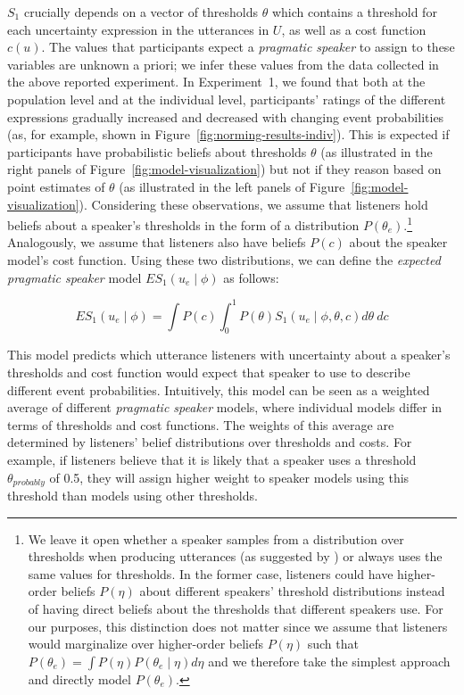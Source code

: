 \documentclass[man, floatsintext]{apa6}
\begin{document}
$S_1$ crucially depends on a vector of thresholds $\theta$ which contains a threshold for each uncertainty expression in the utterances in $U$, 
as well as a cost function $c(u)$. The values that participants expect a \textit{pragmatic speaker} to assign 
to these variables are unknown a priori; we infer these values from the data collected in the above reported experiment. 
In Experiment~1, we found that both at the population level and at the individual level, 
participants' ratings of the different expressions gradually increased and decreased with changing event probabilities 
(as, for example, shown in Figure~\ref{fig:norming-results-indiv}). This is expected if participants
have probabilistic beliefs about thresholds $\theta$ (as illustrated in the right panels of Figure~\ref{fig:model-visualization}) but not if they reason based on point estimates of $\theta$ (as illustrated in the left panels of Figure~\ref{fig:model-visualization}).
Considering these observations,  we assume that listeners hold beliefs about a speaker's thresholds in the form of a distribution $P\left(\theta_e\right)$.\footnote{We leave it open 
whether a {speaker} samples from a distribution over thresholds when producing utterances (as suggested by \textcite{Qing2015}) 
or always uses the same values for thresholds. In the former case, listeners could have higher-order beliefs  $P(\eta)$ 
about different {speakers}' threshold distributions instead of having direct beliefs about the thresholds that different 
{speakers} use. For our purposes, this distinction does not matter since we assume that listeners would marginalize over higher-order beliefs $P(\eta)$ such that  $P\left(\theta_e\right) = \int P\left(\eta\right) P\left(\theta_e \mid \eta\right) d\eta$ and we therefore take the simplest approach and directly model $P\left(\theta_e\right)$. } Analogously, we assume that  listeners also have beliefs $P(c)$ about the speaker model's cost function.
Using these two distributions, we can define the \textit{expected pragmatic speaker} model $ES_1\left(u_e \mid \phi \right)$ as follows:

$$ES_1\left(u_e \mid \phi \right) = \int P(c) \int_0^1 P(\theta) S_1\left(u _e\mid \phi, \theta, c\right) d\theta \  d c$$

This model predicts which utterance listeners with uncertainty about a speaker's thresholds and cost function would expect that {speaker} to use to describe different event probabilities. 
Intuitively, this model can be seen as a weighted average of different \textit{pragmatic speaker} models, where individual models differ in terms of thresholds and cost functions.  The weights of this average are determined by listeners' belief distributions over thresholds and costs. For example, if listeners believe that it is likely that a speaker uses a threshold $\theta_{probably}$ of 0.5, they will assign higher weight to speaker models
using this threshold than models using other thresholds. 
\end{document}
